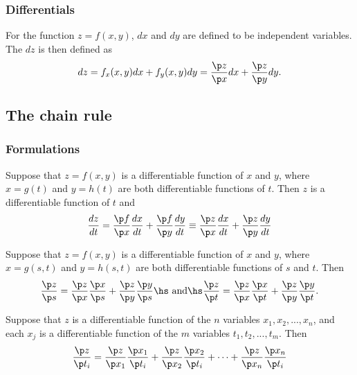 \documentclass{article}
\begin{document}
\subsubsection{Differentials}

\begin{definition}
    For the function $z=f(x,y)$,  $dx$ and $dy$ are
    defined to be independent variables. The  $dz$
    is then defined as
    \begin{align*}
        dz = f_x(x,y)dx + f_y(x,y)dy 
        = \frac{\p z}{\p x}dx + \frac{\p z}{\p y}dy.
    \end{align*}
\end{definition}


\subsection{The chain rule}


\subsubsection{Formulations}

\begin{theorem}
    Suppose that $z=f(x,y)$ is a differentiable function of $x$ and $y$,
    where $x=g(t)$ and $y=h(t)$ are both differentiable functions of $t$.
    Then $z$ is a differentiable function of $t$ and
    \begin{align*}
        \frac{dz}{dt}=
        \frac{\p f}{\p x}\frac{dx}{dt}+\frac{\p f}{\p y}\frac{dy}{dt}
        \equiv \frac{\p z}{\p x}\frac{dx}{dt}+\frac{\p z}{\p y}\frac{dy}{dt}
    \end{align*}
\end{theorem}
\begin{theorem}
    Suppose that $z=f(x,y)$ is a differentiable function of $x$ and $y$,
    where $x=g(s,t)$ and $y=h(s,t)$ are both differentiable functions of
    $s$ and $t$. Then
    \begin{align*}
        \frac{\p z}{\p s}=\frac{\p z}{\p x}\frac{\p x}{\p s}
        + \frac{\p z}{\p y}\frac{\p y}{\p s}
        \text{\hs and\hs}
        \frac{\p z}{\p t}=\frac{\p z}{\p x}\frac{\p x}{\p t}
        + \frac{\p z}{\p y}\frac{\p y}{\p t}.
    \end{align*} 
\end{theorem}
\begin{theorem}
    Suppose that $z$ is a differentiable function of the $n$ variables
    $x_1, x_2, ..., x_n$, and each $x_j$ is a differentiable function of
    the $m$ variables $t_1,t_2, ...,t_m$. Then
    \begin{align*}
        \frac{\p z}{\p t_i}=
        \frac{\p z}{\p x_1}\frac{\p x_1}{\p t_i}
        + \frac{\p z}{\p x_2}\frac{\p x_2}{\p t_i}
        + \cdots
        + \frac{\p z}{\p x_n}\frac{\p x_n}{\p t_i}
    \end{align*} 
\end{theorem}
\end{document}
